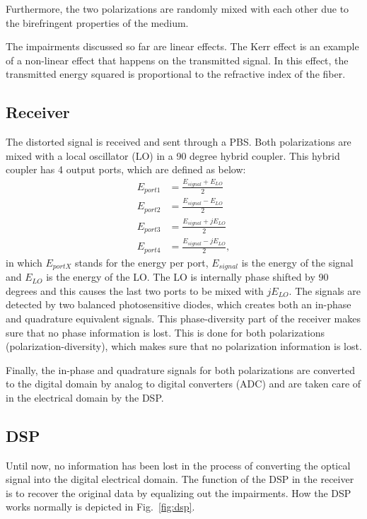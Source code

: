 \documentclass[journal,10pt,twoside, a4paper]{IEEEtran}
\begin{document}
Furthermore, the two polarizations are randomly mixed with each other due to the birefringent properties of the medium\cite{coherent_detection,PMD}.

The impairments discussed so far are linear effects. The Kerr effect is an example of a non-linear effect that happens on the transmitted signal. In this effect, the transmitted energy squared is proportional to the refractive index of the fiber.

\subsection{Receiver}
The distorted signal is received and sent through a PBS. Both polarizations are mixed with a local oscillator (LO) in a 90 degree hybrid coupler. This hybrid coupler has 4 output ports, which are defined as below:
\begin{align}
    E_{port1} &= \frac{E_{signal} + E_{LO}}{2}\\
    E_{port2} &= \frac{E_{signal} - E_{LO}}{2}\\
    E_{port3} &= \frac{E_{signal} + jE_{LO}}{2}\\
    E_{port4} &= \frac{E_{signal} - jE_{LO}}{2},
\end{align}
in which $E_{portX}$ stands for the energy per port, $E_{signal}$ is the energy of the signal and $E_{LO}$ is the energy of the LO. The LO is internally phase shifted by 90 degrees and this causes the last two ports to be mixed with $jE_{LO}$. The signals are detected by two balanced photosensitive diodes, which creates both an in-phase and quadrature equivalent signals. This phase-diversity part of the receiver makes sure that no phase information is lost. This is done for both polarizations (polarization-diversity), which makes sure that no polarization information is lost.

Finally, the in-phase and quadrature signals for both polarizations are converted to the digital domain by analog to digital converters (ADC) and are taken care of in the electrical domain by the DSP.

\subsection{DSP}
Until now, no information has been lost in the process of converting the optical signal into the digital electrical domain. The function of the DSP in the receiver is to recover the original data by equalizing out the impairments. How the DSP works normally is depicted in Fig.~\ref{fig:dsp}.
\end{document}
